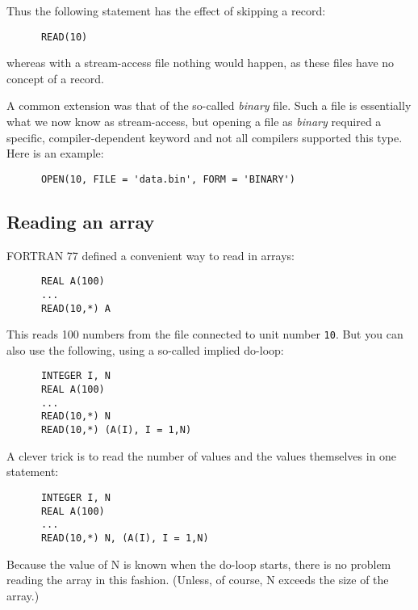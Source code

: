 Thus the following statement has the effect of skipping a record:
%
\begin{verbatim}
      READ(10)
\end{verbatim}
%
\noindent whereas with a stream-access file nothing would happen, as these files have no
concept of a record.

A common extension was that of the so-called \emph{binary} file. Such a file is essentially
what we now know as stream-access, but opening a file as \emph{binary} required a specific,
compiler-dependent keyword and not all compilers supported this type. Here is an example:
%
\begin{verbatim}
      OPEN(10, FILE = 'data.bin', FORM = 'BINARY')
\end{verbatim}


\subsection{Reading an array}
FORTRAN 77 defined a convenient way to read in arrays:
%
\begin{verbatim}
      REAL A(100)
      ...
      READ(10,*) A
\end{verbatim}
%
This reads 100 numbers from the file connected to unit number \verb+10+. But you can
also use the following, using a so-called implied do-loop:
%
\begin{verbatim}
      INTEGER I, N
      REAL A(100)
      ...
      READ(10,*) N
      READ(10,*) (A(I), I = 1,N)
\end{verbatim}
%
A clever trick is to read the number of values and the values themselves in one statement:
%
\begin{verbatim}
      INTEGER I, N
      REAL A(100)
      ...
      READ(10,*) N, (A(I), I = 1,N)
\end{verbatim}
%
Because the value of N is known when the do-loop starts, there is no problem reading
the array in this fashion. (Unless, of course, N exceeds the size of the array.)
